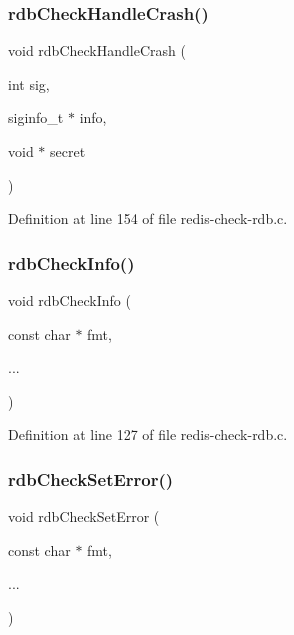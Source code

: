 \subsubsection{\texorpdfstring{rdb\+Check\+Handle\+Crash()}{rdbCheckHandleCrash()}}
{\footnotesize\ttfamily void rdb\+Check\+Handle\+Crash (\begin{DoxyParamCaption}\item[{int}]{sig,  }\item[{siginfo\+\_\+t $\ast$}]{info,  }\item[{void $\ast$}]{secret }\end{DoxyParamCaption})}



Definition at line 154 of file redis-\/check-\/rdb.\+c.

\mbox{\label{redis-check-rdb_8c_a6c0801e244c03a2379800bbd061e7287}} 
\subsubsection{\texorpdfstring{rdb\+Check\+Info()}{rdbCheckInfo()}}
{\footnotesize\ttfamily void rdb\+Check\+Info (\begin{DoxyParamCaption}\item[{const char $\ast$}]{fmt,  }\item[{}]{... }\end{DoxyParamCaption})}



Definition at line 127 of file redis-\/check-\/rdb.\+c.

\mbox{\label{redis-check-rdb_8c_aeaa1610f1c3775f7496cea0bad6161bc}} 
\subsubsection{\texorpdfstring{rdb\+Check\+Set\+Error()}{rdbCheckSetError()}}
{\footnotesize\ttfamily void rdb\+Check\+Set\+Error (\begin{DoxyParamCaption}\item[{const char $\ast$}]{fmt,  }\item[{}]{... }\end{DoxyParamCaption})}



